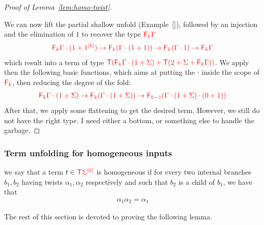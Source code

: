 \begin{proof}[Proof of Lemma~\ref{lem:homo-twist}]
\begin{center}
  \end{center}
  We can now lift the partial shallow unfold (Example~\ref{}), followed by an injection and the elimination of $1$ to recover the type $\ranked{\reduce k \Gamma}$
  \begin{align*}
  \ranked{\reduce k \Gamma\cdot(1+\mati k 1)\to \reduce k (\Gamma\cdot(1+1))\to \reduce k (\Gamma\cdot 1) \to  \reduce k \Gamma}
\end{align*}
which result into a term of type $\ranked{\tmonad(\reduce k\Gamma\cdot(1+\Sigma)+\tmonad(2+\Sigma+\reduce k \Gamma))}$. We apply then the following basic functions, which aims at putting the $\cdot$ inside the scope of $\reduce k$, then reducing the degree of the fold:
\begin{align*}
\ranked{\reduce k\Gamma\cdot(1+\Sigma)\to \reduce k(\Gamma\cdot(1+\Sigma))\to \reduce {k-1}(\Gamma\cdot(1+\Sigma)\cdot (0+1)) }
\end{align*}
After that, we apply some flattening to get the desired term. However, we still do not have the right type. I need either a bottom, or something else to handle the garbage.
\end{proof}


\subsubsection{Term unfolding for homogeneous inputs}
\label{subsec:something-homo-unfold}
we say that a term $ t \in \tmonad \mati k \rSigma$ is homogeneous if for every two internal branches $b_1, b_2$ having twists $\alpha_1, \alpha_2$ respectively and such that $b_2$ is a child of $b_1$, we have that
\begin{align*}
\alpha_1\alpha_2=\alpha_1
\end{align*}

The rest of this section is devoted to proving the following lemma. 

